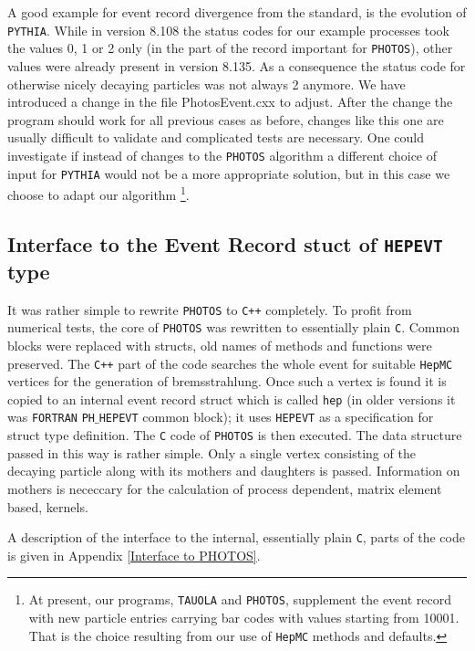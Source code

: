 \documentclass[]{Photos_interface_design}
\begin{document}
A good example for event record divergence from the standard,
is the evolution of {\tt PYTHIA}. While in version 8.108 the status codes for 
our example processes took the values 0, 1 or 2  only (in the part of the record 
important for {\tt PHOTOS}), other values were already present in
version 8.135. As a consequence the status code for 
otherwise nicely decaying particles was not always 2 anymore. We have introduced 
a change  in the file PhotosEvent.cxx to adjust. After  the change
the program should work for all previous cases as before, 
changes like this one are usually difficult to validate
and complicated  tests are necessary. One could  investigate 
if instead of changes to the {\tt PHOTOS} algorithm a different choice of  input for {\tt PYTHIA} would not 
be a more appropriate 
solution, but in this case we choose to adapt our algorithm%
\footnote{ At present, our programs, {\tt TAUOLA} and
 {\tt PHOTOS}, supplement the event record with new particle entries carrying bar codes 
with values starting from 10001. That is the choice resulting from our use 
of {\tt HepMC} methods and defaults.  }.


\subsection{Interface to the Event Record stuct of {\tt HEPEVT} type}
\label{sect:F77fill}

It was rather simple to  rewrite {\tt PHOTOS} to
{\tt C++} completely. To profit from numerical tests, the  core of {\tt PHOTOS}
was rewritten to essentially  plain  {\tt C}. Common blocks were replaced
with structs, old names of methods and functions were preserved. The 
{\tt C++} part of the code searches the whole event for
suitable {\tt HepMC} vertices for the generation of bremsstrahlung. Once such
a vertex is found it is copied to an internal event record struct  which is 
called {\tt hep}  (in older versions it was {\tt FORTRAN} {\tt PH$\_$HEPEVT} common block);
it uses {\tt HEPEVT}  as a specification for struct type definition.
The {\tt C} code of {\tt PHOTOS} is then executed.
The data structure passed in this way is rather simple. Only a single vertex consisting
of the decaying particle along with its mothers and daughters is passed. Information 
on mothers is nececcary  for the calculation of process dependent, matrix element based, 
kernels.



A description of the interface to the internal, essentially plain {\tt C}, parts of the code is
given in  Appendix \ref{Interface to PHOTOS}.
\end{document}
